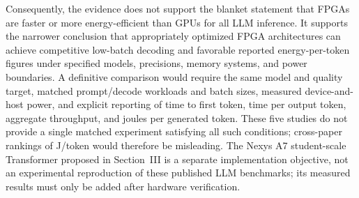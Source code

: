 Consequently, the evidence does not support the blanket statement that FPGAs are faster or more energy-efficient than GPUs for all LLM inference. It supports the narrower conclusion that appropriately optimized FPGA architectures can achieve competitive low-batch decoding and favorable reported energy-per-token figures under specified models, precisions, memory systems, and power boundaries. A definitive comparison would require the same model and quality target, matched prompt/decode workloads and batch sizes, measured device-and-host power, and explicit reporting of time to first token, time per output token, aggregate throughput, and joules per generated token. These five studies do not provide a single matched experiment satisfying all such conditions; cross-paper rankings of J/token would therefore be misleading. The Nexys A7 student-scale Transformer proposed in Section~III is a separate implementation objective, not an experimental reproduction of these published LLM benchmarks; its measured results must only be added after hardware verification.
